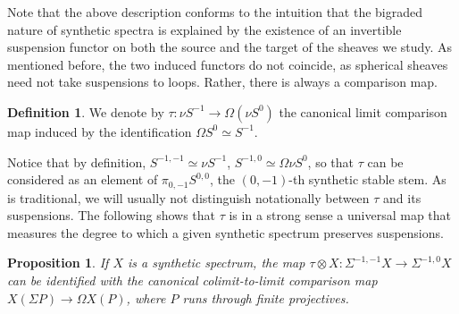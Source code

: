 \documentclass[oneside,a4paper]{amsart}
\theoremstyle{plain}
\newtheorem{prop}[thm]{Proposition}
\theoremstyle{definition}
\newtheorem{defin}[thm]{Definition}
\theoremstyle{remark}
\begin{document}
Note that the above description conforms to the intuition that the bigraded nature of synthetic spectra is explained by the existence of an invertible suspension functor on both the source and the target of the sheaves we study. As mentioned before, the two induced functors do not coincide, as spherical sheaves need not take suspensions to loops. Rather, there is always a comparison map. 

\begin{defin}
We denote by $\tau \colon \nu S^{-1} \rightarrow \Omega (\nu S^{0})$ the canonical limit comparison map induced by the identification $\Omega S^{0} \simeq S^{-1}$. 
\end{defin}
Notice that by definition, $S^{-1, -1} \simeq \nu S^{-1}$, $S^{-1, 0} \simeq \Omega \nu S^{0}$, so that $\tau$ can be considered as an element of $\pi_{0, -1} S^{0,0}$, the $(0, -1)$-th synthetic stable stem. As is traditional, we will usually not distinguish notationally between $\tau$ and its suspensions. The following shows that $\tau$ is in a strong sense a universal map that measures the degree to which a given synthetic spectrum preserves suspensions.

\begin{prop}
\label{prop:transfer_map_can_be_identified_with_tau}
If $X$ is a synthetic spectrum, the map $\tau \otimes X \colon \Sigma^{-1, -1} X \rightarrow \Sigma^{-1, 0}X$ can be identified with the canonical colimit-to-limit comparison map $X(\Sigma P) \rightarrow \Omega X(P)$, where $P$ runs through finite projectives. 
\end{prop}
\end{document}
